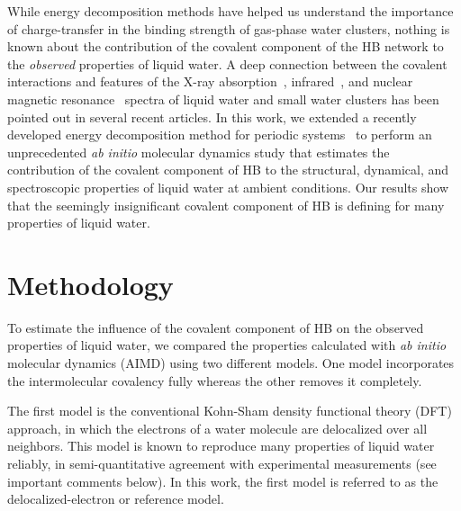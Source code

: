 \documentclass[journal=jacsat,manuscript=article]{achemso}
\begin{document}

While energy decomposition methods have helped us understand the importance of charge-transfer in the binding strength of gas-phase water clusters, nothing is known about the contribution of the covalent component of the HB network to the \emph{observed} properties of liquid water. 
A deep connection between the covalent interactions and features of the X-ray absorption~\cite{NatureComm2013,ZZZ}, infrared~\cite{JPCL2013,Faraday2011,ZZZ}, and nuclear magnetic resonance~\cite{NatureComm2015,ZZZ} spectra of liquid water and small water clusters has been pointed out in several recent articles. 
In this work, we extended a recently developed energy decomposition method for periodic systems~\cite{Khaliullin2013JCTC} to perform an unprecedented \emph{ab initio} molecular dynamics study that estimates the contribution of the covalent component of HB to the structural, dynamical, and spectroscopic properties of liquid water at ambient conditions. 
Our results show that the seemingly insignificant covalent component of HB is defining for many properties of liquid water. 
%

\section{Methodology}


To estimate the influence of the covalent component of HB on the observed properties of liquid water, we compared the properties calculated with \emph{ab initio} molecular dynamics (AIMD) using two different models. 
One model incorporates the intermolecular covalency fully whereas the other removes it completely.

The first model is the conventional Kohn-Sham density functional theory (DFT) approach, in which the electrons of a water molecule are delocalized over all neighbors. 
This model is known to reproduce many properties of liquid water reliably, in semi-quantitative agreement with experimental measurements (see important comments below). 
In this work, the first model is referred to as the delocalized-electron or reference model. 
\end{document}

